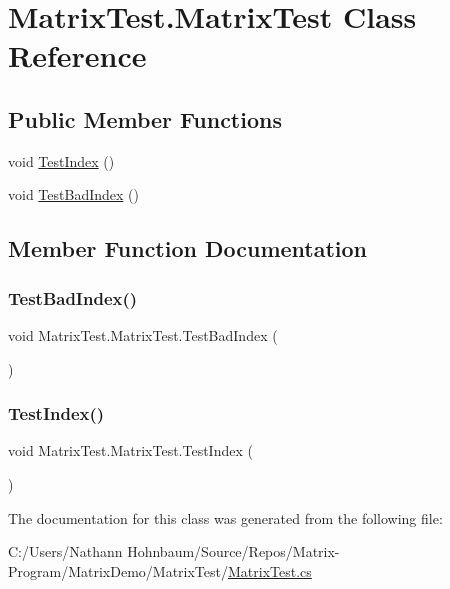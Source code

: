 \hypertarget{class_matrix_test_1_1_matrix_test}{}\section{Matrix\+Test.\+Matrix\+Test Class Reference}
\label{class_matrix_test_1_1_matrix_test}
\subsection*{Public Member Functions}
\begin{DoxyCompactItemize}
\item 
void \mbox{\hyperlink{class_matrix_test_1_1_matrix_test_a0b1c95f31d09e8a879d2b36acf4c3e87}{Test\+Index}} ()
\item 
void \mbox{\hyperlink{class_matrix_test_1_1_matrix_test_abe913795621ee7220dbcbc08f38942c7}{Test\+Bad\+Index}} ()
\end{DoxyCompactItemize}


\subsection{Member Function Documentation}
\mbox{\label{class_matrix_test_1_1_matrix_test_abe913795621ee7220dbcbc08f38942c7}} 
\subsubsection{\texorpdfstring{Test\+Bad\+Index()}{TestBadIndex()}}
{\footnotesize\ttfamily void Matrix\+Test.\+Matrix\+Test.\+Test\+Bad\+Index (\begin{DoxyParamCaption}{ }\end{DoxyParamCaption})}

\mbox{\label{class_matrix_test_1_1_matrix_test_a0b1c95f31d09e8a879d2b36acf4c3e87}} 
\subsubsection{\texorpdfstring{Test\+Index()}{TestIndex()}}
{\footnotesize\ttfamily void Matrix\+Test.\+Matrix\+Test.\+Test\+Index (\begin{DoxyParamCaption}{ }\end{DoxyParamCaption})}



The documentation for this class was generated from the following file\+:\begin{DoxyCompactItemize}
\item 
C\+:/\+Users/\+Nathann Hohnbaum/\+Source/\+Repos/\+Matrix-\/\+Program/\+Matrix\+Demo/\+Matrix\+Test/\mbox{\hyperlink{_matrix_test_8cs}{Matrix\+Test.\+cs}}\end{DoxyCompactItemize}
